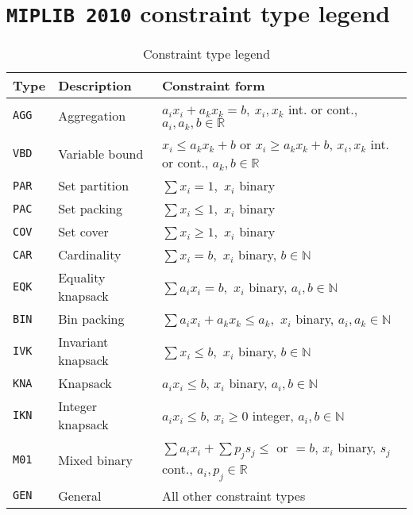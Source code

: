 \section{\texttt{MIPLIB 2010} constraint type legend}

\begin{table}[h]
	\centering
	\caption{Constraint type legend \cite{MIPLIB}}
	\label{table:constraint_type}
	\begin{tabular}{@{}lll@{}}
		\toprule
		Type           & Description        & Constraint form                                                                                           \\ \midrule
		\texttt{AGG} & Aggregation        & $a_i x_i+a_k x_k=b,\ x_i , x_k$ int. or cont., $a_i , a_k , b \in \mathbb{R}$                  \\
		\texttt{VBD} & Variable bound     & $x_i \le a_k x_k + b$ or $x_i\ge a_k x_k + b$, $x_i, x_k$ int. or cont., $a_k, b\in\mathbb{R}$ \\
		\texttt{PAR} & Set partition      & $\sum x_i = 1,$ $x_i$ binary                                                                   \\
		\texttt{PAC} & Set packing        & $\sum x_i \le 1,$ $x_i$ binary                                                                 \\
		\texttt{COV} & Set cover          & $\sum x_i \ge 1,$ $x_i$ binary                                                                 \\
		\texttt{CAR} & Cardinality        & $\sum x_i = b,$ $x_i$ binary, $b\in\mathbb{N}$                                                 \\
		\texttt{EQK} & Equality knapsack  & $\sum a_i x_i = b,$ $x_i$ binary, $a_i , b\in\mathbb{N}$                                       \\
		\texttt{BIN} & Bin packing        & $\sum a_i x_i  + a_k x_k \le a_k,$ $x_i$ binary, $a_i , a_k\in\mathbb{N}$                      \\
		\texttt{IVK} & Invariant knapsack & $\sum x_i \le b,$ $x_i$ binary, $b\in\mathbb{N}$                                               \\
		\texttt{KNA} & Knapsack           & $a_i x_i \le b$, $x_i$ binary, $a_i,b\in\mathbb{N}$                                            \\
		\texttt{IKN} & Integer knapsack   & $a_i x_i \le b$, $x_i\ge 0$ integer, $a_i,b\in\mathbb{N}$                                      \\
		\texttt{M01} & Mixed binary       & $\sum a_i x_i + \sum p_j s_j \le$ or $=b$, $x_i$ binary, $s_j$ cont., $a_i, p_j\in\mathbb{R}$  \\
		\texttt{GEN} & General            & All other constraint types                                                                     \\ \bottomrule
	\end{tabular}
\end{table}